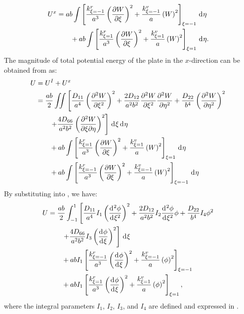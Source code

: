 \documentclass[preprint,12pt,number]{elsarticle}
\newcommand{\id}{\mathrm{d}\mkern1mu}
\begin{document}
%
\begin{equation}\label{eq:poten_energy_edgex2}
\begin{split}
	U^{x} &= ab \int\left[\frac{k^r_{\xi=-1}}{a^3} \left( \frac{\partial W}{\partial \xi} \right)^2 + \frac{k^v_{\xi=-1}}{a} \left( W \right)^2\right]_{\xi=-1} \, \id \eta \\
	&\qquad + ab \int\left[\frac{k^r_{\xi=1}}{a^3} \left( \frac{\partial W}{\partial \xi} \right)^2 + \frac{k^v_{\xi=1}}{a} \left( W \right)^2\right]_{\xi=1} \, \id \eta.
\end{split}
\end{equation}
%
The magnitude of total potential energy of the plate in the $x$-direction can be obtained from  as:
%
\begin{equation}\label{eq:poten_energy_tolx}
\begin{split}
	U &= U^{I} + U^{x} \\
	&= \frac{ab}{2} \iint \left[ \frac{D_{11}}{a^4} \left( \frac{\partial^2 W}{\partial \xi^2} \right)^2 + \frac{2 D_{12}}{a^2 b^2} \frac{\partial^2 W}{\partial \xi^2} \frac{\partial^2 W}{\partial \eta^2} + \frac{D_{22}}{b^4} \left( \frac{\partial^2 W}{\partial \eta^2} \right)^2 \right. \\
	&\qquad \left.  + \frac{4 D_{66}}{a^2 b^2} \left( \frac{\partial^2 W}{\partial \xi \partial \eta} \right)^2 \right] \, \id\xi \, \id\eta \\
	&\qquad + ab \int \left[\frac{k^r_{\xi=1}}{a^3} \left( \frac{\partial W}{\partial \xi} \right)^2 + \frac{k^v_{\xi=1}}{a} \left( W \right)^2 \right]_{\xi=1} \, \id \eta \\
	&\qquad + ab \int \left[\frac{k^r_{\xi=-1}}{a^3} \left( \frac{\partial W}{\partial \xi} \right)^2 + \frac{k^v_{\xi=-1}}{a} \left( W \right)^2 \right]_{\xi=-1} \, \id \eta
\end{split}
\end{equation}
%
By substituting  into , we have:
%
\begin{equation}\label{eq:poten_energy_tolx2}
\begin{split}
	U&=\frac{ab}{2} \int_{-1}^{1} \left[ \frac{D_{11}}{a^4}I_1 \left( \frac{\id^2\phi }{\id \xi^2} \right)^2 + \frac{2 D_{12}}{a^2 b^2}I_2 \frac{\id^2\phi }{\id \xi^2}\phi  + \frac{D_{22}}{b^4}I_4  \phi^2 \right. \\
	&\qquad \left. + \frac{4 D_{66}}{a^2 b^2}I_3 \left( \frac{\id \phi }{\id \xi}\right)^2 \right] \, \id\xi \\
	&\qquad + abI_1 \left[\frac{k^r_{\xi=-1}}{a^3} \left( \frac{\id \phi}{\id \xi} \right)^2+ \frac{k^v_{\xi=-1}}{a} \left( \phi \right)^2\right]_{\xi=-1}\\
	&\qquad + abI_1 \left[\frac{k^r_{\xi=1}}{a^3} \left( \frac{\id \phi}{\id \xi} \right)^2+ \frac{k^v_{\xi=1}}{a} \left( \phi \right)^2\right]_{\xi=1},
\end{split}
\end{equation}
%
where the integral parameters $I_1$, $I_2$, $I_3$, and $ I_4$ are defined and expressed in .
\end{document}
